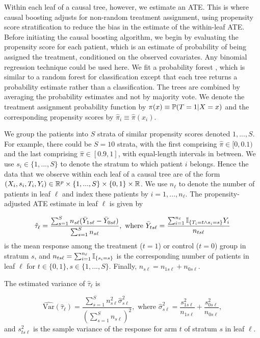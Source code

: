 \documentclass{article}
\begin{document}
Within each leaf of a causal tree, however, we estimate an ATE. This is where
causal boosting adjusts for non-random treatment assignment, using propensity
score stratification to reduce the bias in the estimate of the within-leaf ATE.
Before initiating the causal boosting algorithm, we begin by evaluating the
propensity score for each patient, which is an estimate of probability of being
assigned the treatment, conditioned on the observed covariates.
Any binomial regression technique could be used here. We fit a probability
forest \citep{Malley-etal12}, which is similar to a random forest
for classification \citep{Breiman01} except that each tree returns a
probability estimate rather than a classification. The trees are combined by
averaging the probability estimates and not by majority vote. We denote the
treatment assignment probability function by
$\pi(x) \equiv \mathbb{P}(T = 1 | X = x)$ and the corresponding
propensity scores by $\hat\pi_i \equiv \hat\pi(x_i)$.

We group the patients into $S$ strata of similar propensity scores denoted
$1, ..., S$. For example, there could be $S = 10$ strata, with the first
comprising
$\hat\pi \in [0, 0.1)$ and the last comprising $\hat\pi \in [0.9, 1]$,
with equal-length intervals in between. We use $s_i \in \{1, ..., S\}$ to
denote the stratum to which patient $i$ belongs. Hence the data that we observe
within each leaf of a causal tree are of the form
$(X_i, s_i, T_i, Y_i) \in \mathbb{R}^p \times \{1,...,S\} \times \{0,1\} \times \mathbb{R}$.
We use $n_\ell$ to denote the number of patients in leaf $\ell$ and index
these patients by $i = 1, ..., n_\ell$. The propensity-adjusted ATE estimate
in leaf $\ell$ is given by

\begin{equation}
\label{eqn-stratified}
\hat\tau_\ell = \frac{\sum_{s=1}^Sn_{s\ell}(\bar Y_{1s\ell}-\bar Y_{0s\ell})}
  {\sum_{s=1}^S n_{s\ell}}, \mbox{ where } \bar Y_{ts\ell} =
  \frac{\sum_{i = 1}^{n_\ell}\mathbb{I}_{\{T_i = t \wedge s_i = s\}}Y_i}{n_{ts\ell}}
\end{equation}
is the mean response among the treatment ($t = 1$) or control ($t = 0$) group
in stratum $s$, and $n_{ts\ell} = \sum_{i = 1}^{n_\ell}\mathbb{I}_{\{s_i = s\}}$ is
the corresponding number of patients in leaf $\ell$ for
$t \in \{0, 1\}, s \in \{1, ..., S\}$.
Finally, $n_{s\ell} = n_{1s\ell} + n_{0s\ell}$.

The estimated variance of $\hat\tau_\ell$ is

$$\widehat{\mbox{Var}}(\hat\tau_\ell) =
  \frac{\sum_{s=1}^Sn_{s\ell}^2\hat\sigma_{s\ell}^2}
  {(\sum_{s=1}^Sn_{s\ell})^2}, \mbox{ where }\hat\sigma^2_{s\ell} =
  \frac{s^2_{1s\ell}}{n_{1s\ell}} + \frac{s^2_{0s\ell}}{n_{0s\ell}},$$
and $s_{ts\ell}^2$ is the sample variance of the response for arm $t$ of
stratum $s$ in leaf $\ell$.
\end{document}

